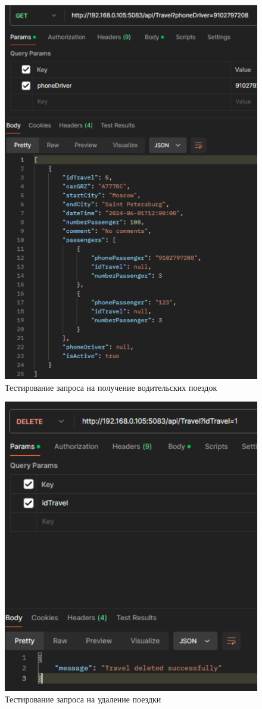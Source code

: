 \begin{figure}[H]
	\centering
	\includegraphics[width=0.8\linewidth]{images/test6}
	\caption{Тестирование запроса на получение водительских поездок}
	\label{fig:test6}
\end{figure}

\begin{figure}
	\centering
	\includegraphics[width=0.9\linewidth]{images/test7}
	\caption{Тестирование запроса на удаление поездки}
	\label{fig:test7}
\end{figure}

